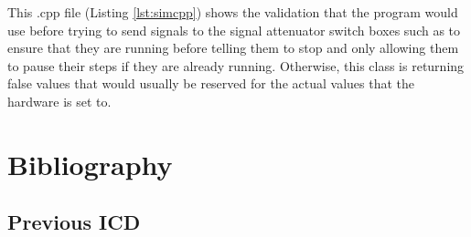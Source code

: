 \documentclass [a4paper,12pt,oneside,final,titlepage]{article}
\begin{document}
	

This .cpp file (Listing \ref{lst:simcpp}) shows the validation that the program would use before trying to send signals to the signal attenuator switch boxes such as to ensure that they are running before telling them to stop and only allowing them to pause their steps if they are already running. Otherwise, this class is returning false values that would usually be reserved for the actual values that the hardware is set to. 

	

	\newpage
	\section{Bibliography}
	{}
	
	\newpage
	\begin{appendices}
		\section{Previous ICD}
		\label{appendix:icd}
		
	\end{appendices}	


	

	
	
\end{document}
